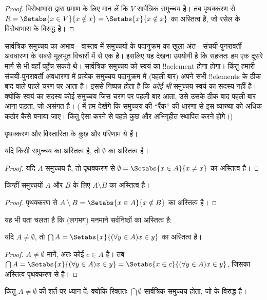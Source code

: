 \documentclass[../../../include/open-logic-section]{subfiles}
\begin{document}
\begin{proof}
विरोधाभास द्वारा प्रमाण के लिए मान लें कि $V$ सार्वत्रिक समुच्चय है। तब
पृथक्करण से $R = \Setabs{x \in V}{x \notin x} =
\Setabs{x}{x \notin x}$ का अस्तित्व है, जो रसेल के विरोधाभास के विरुद्ध है।
\end{proof}

सार्वत्रिक समुच्चय का अभाव---वास्तव में समुच्चयों के पदानुक्रम का खुला
अंत---संचयी-पुनरावर्ती अवधारणा के सबसे मूलभूत विचारों में से एक है। इसलिए
यह देखना उपयोगी है कि सहजतः हम एक दूसरे मार्ग से भी वहाँ पहुँच सकते थे।
सार्वत्रिक समुच्चय को स्वयं का !!a{element} होना होगा। किंतु हमारी
संचयी-पुनरावर्ती अवधारणा में प्रत्येक समुच्चय पदानुक्रम में (पहली बार) अपने
सभी !!{element}s के ठीक बाद वाले पहले चरण पर आता है। इससे निष्पन्न होता है
कि \emph{कोई भी} समुच्चय स्वयं का सदस्य नहीं है। क्योंकि स्वयं का सदस्य कोई
समुच्चय जिस चरण पर पहली बार आता, उसे उसके ठीक बाद पहली बार आना पड़ता, जो
असंगत है। ( में हम देखेंगे कि समुच्चय
की ``रैंक'' की धारणा से इस व्याख्या को अधिक कठोर कैसे बनाया जाए। किंतु ऐसा
करने से पहले कुछ और अभिगृहीत स्थापित करने होंगे।)

पृथक्करण और विस्तारिता के कुछ और परिणाम ये हैं।

\begin{prop}
यदि किसी समुच्चय का अस्तित्व है, तो $\emptyset$ का अस्तित्व है।
\end{prop}

\begin{proof}
यदि $A$ समुच्चय है, तो पृथक्करण से
$\emptyset = \Setabs{x \in A}{x \neq x}$ का अस्तित्व है।
\end{proof}

\begin{prop}
किन्हीं समुच्चयों $A$ और $B$ के लिए $A \setminus B$ का अस्तित्व है।
\end{prop}

\begin{proof}
पृथक्करण से $A \setminus B = \Setabs{x \in A}{x \notin B}$ का अस्तित्व है।
\end{proof}

यह भी पता चलता है कि (लगभग) मनमाने सर्वनिष्ठों का अस्तित्व है:

\begin{prop}
यदि $A \neq \emptyset$, तो
$\bigcap A = \Setabs{x}{(\forall y \in A)x \in y}$ का अस्तित्व है।
\end{prop}

\begin{proof}
$A \neq \emptyset$ मानें, अतः कोई $c \in A$ है। तब
$\bigcap A = \Setabs{x}{(\forall y \in A)x \in y} =
\Setabs{x \in c}{(\forall y \in A)x \in y}$, जिसका अस्तित्व पृथक्करण से है।
\end{proof}

किंतु $A \neq \emptyset$ की शर्त पर ध्यान दें; क्योंकि रिक्ततः
$\bigcap \emptyset$ सार्वत्रिक समुच्चय होता, जो
 के विरुद्ध है।
\end{document}
